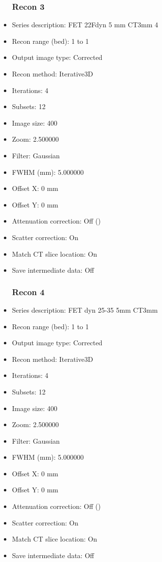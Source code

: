 \documentclass[12pt]{article}
\begin{document}
\begin{itemize}[noitemsep]
\subsubsection{Recon 3}
\item Series description: FET 22Fdyn 5 mm CT3mm 4
\item Recon range (bed): 1 to 1
\item Output image type: Corrected
\item Recon method: Iterative3D
\item Iterations: 4
\item Subsets: 12
\item Image size: 400
\item Zoom: 2.500000
\item Filter: Gaussian
\item FWHM (mm): 5.000000
\item Offset X: 0 mm
\item Offset Y: 0 mm
\item Attenuation correction: Off ()
\item Scatter correction: On
\item Match CT slice location: On
\item Save intermediate data: Off
\subsubsection{Recon 4}
\item Series description: FET dyn 25-35 5mm CT3mm
\item Recon range (bed): 1 to 1
\item Output image type: Corrected
\item Recon method: Iterative3D
\item Iterations: 4
\item Subsets: 12
\item Image size: 400
\item Zoom: 2.500000
\item Filter: Gaussian
\item FWHM (mm): 5.000000
\item Offset X: 0 mm
\item Offset Y: 0 mm
\item Attenuation correction: Off ()
\item Scatter correction: On
\item Match CT slice location: On
\item Save intermediate data: Off
\end{itemize}
\end{document}
